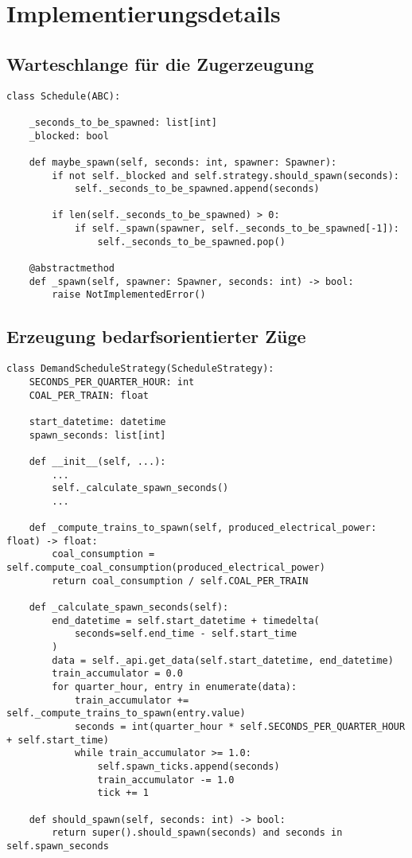 \section{Implementierungsdetails}

\subsection{Warteschlange für die Zugerzeugung}

\lstset{language=python}
\begin{lstlisting}[caption={Quelltextunterschrift}, label=code:template-method-code]
class Schedule(ABC):

    _seconds_to_be_spawned: list[int]
    _blocked: bool

    def maybe_spawn(self, seconds: int, spawner: Spawner):
        if not self._blocked and self.strategy.should_spawn(seconds):
            self._seconds_to_be_spawned.append(seconds)

        if len(self._seconds_to_be_spawned) > 0:
            if self._spawn(spawner, self._seconds_to_be_spawned[-1]):
                self._seconds_to_be_spawned.pop()

    @abstractmethod
    def _spawn(self, spawner: Spawner, seconds: int) -> bool:
    	raise NotImplementedError()
\end{lstlisting}

\subsection{Erzeugung bedarfsorientierter Züge}

\lstset{language=python}
\begin{lstlisting}[caption={Quelltextunterschrift}, label=code:template-method-code]
class DemandScheduleStrategy(ScheduleStrategy):
    SECONDS_PER_QUARTER_HOUR: int
    COAL_PER_TRAIN: float

    start_datetime: datetime
    spawn_seconds: list[int]
    
    def __init__(self, ...):
        ...
        self._calculate_spawn_seconds()
        ...

    def _compute_trains_to_spawn(self, produced_electrical_power: float) -> float:
        coal_consumption = self.compute_coal_consumption(produced_electrical_power)
        return coal_consumption / self.COAL_PER_TRAIN

    def _calculate_spawn_seconds(self):
        end_datetime = self.start_datetime + timedelta(
            seconds=self.end_time - self.start_time
        )
        data = self._api.get_data(self.start_datetime, end_datetime)
        train_accumulator = 0.0
        for quarter_hour, entry in enumerate(data):
            train_accumulator += self._compute_trains_to_spawn(entry.value)
            seconds = int(quarter_hour * self.SECONDS_PER_QUARTER_HOUR + self.start_time)
            while train_accumulator >= 1.0:
                self.spawn_ticks.append(seconds)
                train_accumulator -= 1.0
                tick += 1
                
	def should_spawn(self, seconds: int) -> bool:
    	return super().should_spawn(seconds) and seconds in self.spawn_seconds
\end{lstlisting}